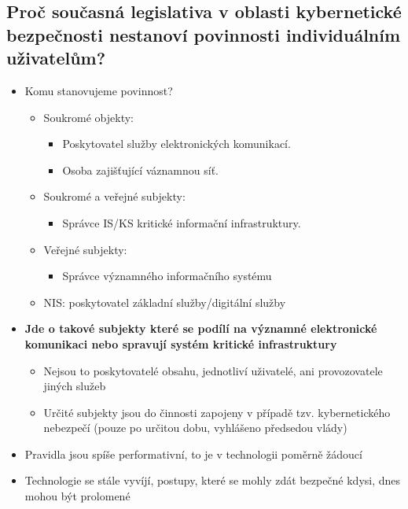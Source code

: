 \subsection{Proč současná legislativa v oblasti kybernetické bezpečnosti nestanoví povinnosti individuálním uživatelům?}
\begin{itemize}
    \item Komu stanovujeme povinnost?
          \begin{itemize}
              \item Soukromé objekty:
                    \begin{itemize}
                        \item Poskytovatel služby elektronických komunikací.
                        \item Osoba zajišťující váznamnou síť.
                    \end{itemize}
              \item Soukromé a veřejné subjekty:
                    \begin{itemize}
                        \item Správce IS/KS kritické informační infrastruktury.
                    \end{itemize}
              \item Veřejné subjekty:
                    \begin{itemize}
                        \item Správce významného informačního systému
                    \end{itemize}
              \item NIS: poskytovatel základní služby/digitální služby
          \end{itemize}
    \item \textbf{Jde o takové subjekty které se podílí na významné elektronické komunikaci nebo spravují systém kritické infrastruktury }
          \begin{itemize}
              \item Nejsou to poskytovatelé obsahu, jednotliví uživatelé, ani provozovatele jiných služeb
              \item Určité subjekty jsou do činnosti zapojeny v případě tzv. kybernetického nebezpečí (pouze po určitou dobu, vyhlášeno předsedou vlády)
          \end{itemize}
    \item Pravidla jsou spíše performativní, to je v technologii poměrně žádoucí
    \item Technologie se stále vyvíjí, postupy, které se mohly zdát bezpečné kdysi, dnes mohou být prolomené

\end{itemize}
